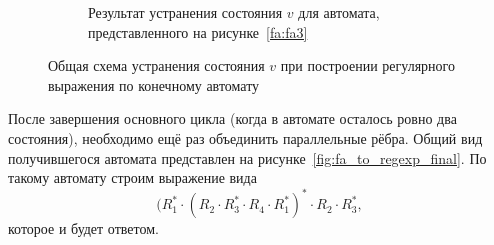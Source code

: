 \begin{figure}
\begin{center}
\begin{subfigure}[b]{0.47\textwidth}
\begin{center}

            \end{center}

            \caption{Результат устранения состояния $v$ для автомата, представленного на рисунке~\ref{fa:fa3}}
            \label{fa:fa4}
        \end{subfigure}
    \end{center}
    \caption{Общая схема устранения состояния $v$ при построении регулярного выражения по конечному автомату}
    \label{fa:fa_3_4}
\end{figure}

После завершения основного цикла (когда в автомате осталось ровно два состояния), необходимо ещё раз объединить параллельные рёбра.
Общий вид получившегося автомата представлен на рисунке~\ref{fig:fa_to_regexp_final}.
По такому автомату строим выражение вида \[(R_1^* \cdot (R_2 \cdot R_3^* \cdot R_4 \cdot R_1^*)^* \cdot R_2 \cdot R_3^*,\] которое и будет ответом.
\begin{marginfigure}

    \begin{center}

    \end{center}

    \caption{Общий вид автомата после завершения основного цикла исключения вершин при построении по нему регулярного выражения}
    \label{fig:fa_to_regexp_final}

\end{marginfigure}

